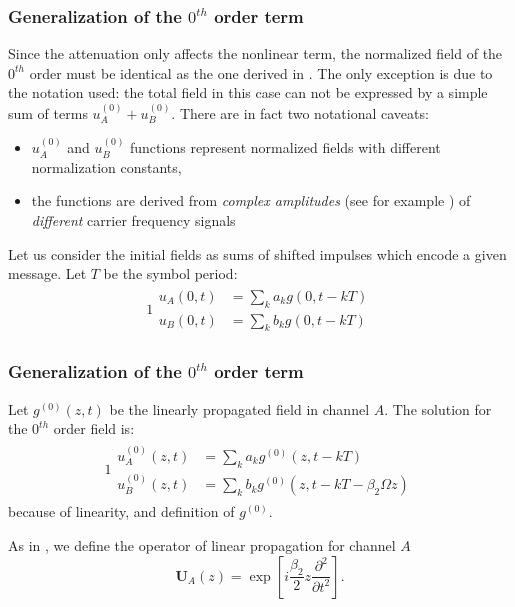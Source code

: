 \documentclass[8pt]{beamer} %
\begin{document}
\begin{frame}
    \frametitle{Generalization of the $0^{th}$ order term}
    Since the attenuation only affects the nonlinear term, the normalized field of the $0^{th}$ order must be identical as the one derived in \cite[eq. 1]{Dar_2013}. The only exception is due to the notation used: the total field in this case can not be expressed by a simple sum of terms $u_A^{(0)}+u_B^{(0)}$. There are in fact two notational caveats:
    \begin{itemize}
        \item $u_A^{(0)}$ and $u_B^{(0)}$ functions represent normalized fields with different normalization constants,
        \item the functions are derived from \textit{complex amplitudes} (see for example \cite[pp. 523-525]{Someda}) of \textit{different} carrier frequency signals
    \end{itemize}

    Let us consider the initial fields as sums of shifted impulses which encode a given message. Let $T$ be the symbol period:
    \begin{alignat}{1}
        \begin{aligned}
            u_A(0, t) & = \sum_{k}a_k g(0, t-kT) \\
            u_B(0, t) & = \sum_{k}b_k g(0, t-kT)
        \end{aligned}
    \end{alignat}
\end{frame}

\begin{frame}
    \frametitle{Generalization of the $0^{th}$ order term}
    Let $g^{(0)}(z, t)$ be the linearly propagated field in channel $A$.
    The solution for the $0^{th}$ order field is:
    \begin{alignat}{1}
        \begin{aligned}\label{eq:modulation}
            u_A^{(0)}(z, t) & = \sum_{k}a_k g^{(0)}(z, t-kT)                    \\
            u_B^{(0)}(z, t) & = \sum_{k}b_k g^{(0)}(z, t-kT - \beta_2 \Omega z)
        \end{aligned}
    \end{alignat}
    because of linearity, and definition of $g^{(0)}$.

    As in \cite{Dar_2013}, we define the operator of linear propagation for channel $A$
    \begin{equation}
        \mathbf{U}_A(z) = \exp\left[i \frac{\beta_2}{2} z \frac{\partial^2}{\partial t^2}\right].
    \end{equation}
\end{frame}
\end{document}
